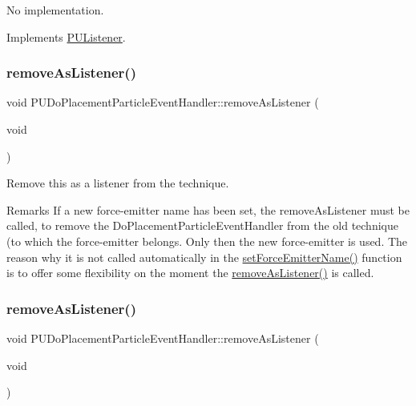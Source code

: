 No implementation. 

Implements \hyperlink{classPUListener}{P\+U\+Listener}.

\mbox{\label{classPUDoPlacementParticleEventHandler_a2d8d0acd323398efa7ff99f64a604c5f}} 
\subsubsection{\texorpdfstring{remove\+As\+Listener()}{removeAsListener()}\hspace{0.1cm}{\footnotesize\ttfamily [1/2]}}
{\footnotesize\ttfamily void P\+U\+Do\+Placement\+Particle\+Event\+Handler\+::remove\+As\+Listener (\begin{DoxyParamCaption}\item[{void}]{ }\end{DoxyParamCaption})}

Remove this as a listener from the technique. \begin{DoxyRemark}{Remarks}
If a new force-\/emitter name has been set, the remove\+As\+Listener must be called, to remove the Do\+Placement\+Particle\+Event\+Handler from the old technique (to which the force-\/emitter belongs. Only then the new force-\/emitter is used. The reason why it is not called automatically in the \hyperlink{classPUDoPlacementParticleEventHandler_a3f2f070e0ebaeb4f15f8f8f9bf4c8237}{set\+Force\+Emitter\+Name()} function is to offer some flexibility on the moment the \hyperlink{classPUDoPlacementParticleEventHandler_a2d8d0acd323398efa7ff99f64a604c5f}{remove\+As\+Listener()} is called. 
\end{DoxyRemark}
\mbox{\label{classPUDoPlacementParticleEventHandler_a2d8d0acd323398efa7ff99f64a604c5f}} 
\subsubsection{\texorpdfstring{remove\+As\+Listener()}{removeAsListener()}\hspace{0.1cm}{\footnotesize\ttfamily [2/2]}}
{\footnotesize\ttfamily void P\+U\+Do\+Placement\+Particle\+Event\+Handler\+::remove\+As\+Listener (\begin{DoxyParamCaption}\item[{void}]{ }\end{DoxyParamCaption})}

